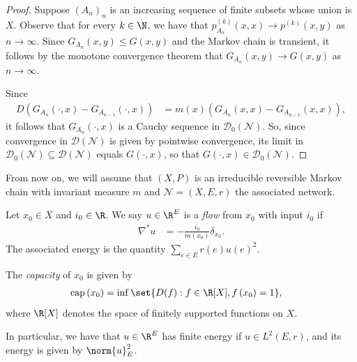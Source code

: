 \documentclass[10pt]{mypackage}
\begin{document}
\begin{proof}
  Suppose $\left( A_n \right)_{n}$ is an increasing sequence of finite subsets whose union is $X$. Observe that for every $k\in \N$, we have that $p_{A_n}^{(k)}\left( x,x \right)\to p^{(k)}\left( x,y \right)$ as $n\to\infty$. Since $G_{A_n}\left( x,y \right)\leq G\left( x,y \right)$ and the Markov chain is transient, it follows by the monotone convergence theorem that $G_{A_n}\left( x,y \right)\to G\left( x,y \right)$ as $n\to\infty$.

  Since
  \begin{align*}
    D\left( G_{A_n}\left( \cdot,x \right) - G_{A_{n-1}}\left( \cdot,x \right) \right) &= m(x)\left( G_{A_n}\left( x,x \right) - G_{A_{n-1}}\left( x,x \right) \right),
  \end{align*}
  it follows that $G_{A_n}\left( \cdot,x \right)$ is a Cauchy sequence in $\mathcal{D}_0\left( \mathcal{N} \right)$. So, since convergence in $\mathcal{D}\left( \mathcal{N} \right)$ is given by pointwise convergence, its limit in $\mathcal{D}_0\left( \mathcal{N} \right)\subseteq \mathcal{D}\left( \mathcal{N} \right)$ equals $G\left( \cdot,x \right)$, so that $G\left( \cdot,x \right)\in \mathcal{D}_0\left( \mathcal{N} \right)$.
\end{proof}
From now on, we will assume that $\left( X,P \right)$ is an irreducible reversible Markov chain with invariant measure $m$ and $\mathcal{N} = \left( X,E,r \right)$ the associated network.
\begin{definition}
  Let $x_0\in X$ and $i_0\in \R$. We say $u\in \R^{E}$ is a \textit{flow} from $x_0$ with input $i_0$ if
  \begin{align*}
    \nabla^{\ast}u &= -\frac{i_0}{m\left( x_0 \right)}\delta_{x_0}.
  \end{align*}
  The associated energy is the quantity $\sum_{e\in E}r(e)u(e)^2$.

  The \textit{capacity} of $x_0$ is given by
  \begin{align*}
    \operatorname{cap}\left( x_0 \right) &= \inf\set{D(f) : f\in \R[X],f\left( x_0 \right) = 1},
  \end{align*}
  where $\R[X]$ denotes the space of finitely supported functions on $X$.
\end{definition}
In particular, we have that $u\in \R^{E}$ has finite energy if $u\in L^2\left( E,r \right)$, and its energy is given by $\norm{u}_{E}^2$.
\end{document}
